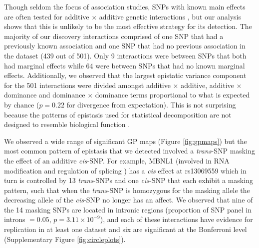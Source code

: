 \documentclass{article}
\begin{document}
Though seldom the focus of association studies, SNPs with known main effects are often tested for additive $\times$ additive genetic interactions \cite{Cordell2009}, but our analysis shows that this is unlikely to be the most effective strategy for its detection. The majority of our discovery interactions comprised of one SNP that had a previously known association and one SNP that had no previous association in the dataset \cite{Powell2013} (439 out of 501). Only 9 interactions were between SNPs that both had marginal effects while 64 were between SNPs that had no known marginal effects. Additionally, we observed that the largest epistatic variance component for the 501 interactions were divided amongst additive $\times$ additive, additive $\times$ dominance and dominance $\times$ dominance terms proportional to what is expected by chance ($p = 0.22$ for divergence from expectation). This is not surprising because the patterns of epistasis used for statistical decomposition are not designed to resemble biological function \cite{Cockerham1954}.

We observed a wide range of significant GP maps (Figure \ref{fig:gpmaps}) but the most common pattern of epistasis that we detected involved a \emph{trans}-SNP masking the effect of an additive \emph{cis}-SNP. For example, MBNL1 (involved in RNA modification and regulation of splicing \cite{Ho2004}) has a \emph{cis} effect at rs13069559 which in turn is controlled by 13 \emph{trans}-SNPs and one \emph{cis}-SNP that each exhibit a masking pattern, such that when the \emph{trans}-SNP is homozygous for the masking allele the decreasing allele of the \emph{cis}-SNP no longer has an affect. We observed that nine of the 14 masking SNPs are located in intronic regions (proportion of SNP panel in introns $= 0.05$, $p = 3.11 \times 10^{-9}$), and each of these interactions have evidence for replication in at least one dataset and six are significant at the Bonferroni level (Supplementary Figure \ref{fig:circleplots}).
\end{document}
